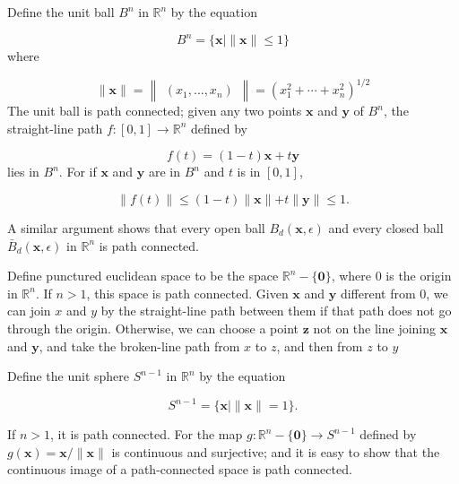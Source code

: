 \begin{centeredblock*}
\begin{example}
\label{ex:\thesection.\theexample}
 Define the unit ball \( B^{n}\) in \(\mathbb{R}^{n}\) by the equation

 \[
 B^{n} = \{ \mathbf{x} \mid \parallel \mathbf{x}\parallel \leq 1\}
 \]
 where

 \[
 \parallel \mathbf{x}\parallel = \begin{Vmatrix}( {x_{1},\ldots ,x_{n}}) \end{Vmatrix} = {( x_1^{2} + \cdots + x_n^{2}) }^{1/2}
 \]
The unit ball is path connected; given any two points \(\mathbf{x}\) and \(\mathbf{y}\) of \(B^{n}\), the straight-line path \(f : [ {0,1}] \rightarrow {\mathbb{R}}^{n}\) defined by

\[
f( t) = ( {1 - t}) \mathbf{x} + t\mathbf{y}
\]
lies in \(B^{n}\). For if \(\mathbf{x}\) and \(\mathbf{y}\) are in \(B^{n}\) and \(t\) is in \([ {0,1}]\),

\[
\parallel f( t) \parallel \leq ( {1 - t}) \parallel \mathbf{x}\parallel + t\parallel \mathbf{y}\parallel \leq 1.
\]

A similar argument shows that every open ball \(B_{d}( {\mathbf{x},\epsilon })\) and every closed ball \(\bar{B}_{d}( {\mathbf{x},\epsilon })\) in \(\mathbb{R}^{n}\) is path connected.
\end{example}
\end{centeredblock*}

\begin{centeredblock}
\begin{example}
\label{ex:\thesection.\theexample}
 Define punctured euclidean space to be the space \(\mathbb{R}^{n} - \{ \mathbf{0}\}\), where 0 is the origin in \(\mathbb{R}^{n}\). If \(n > 1\), this space is path connected. Given \(\mathbf{x}\) and \(\mathbf{y}\) different from 0, we can join \(x\) and \(y\) by the straight-line path between them if that path does not go through the origin. Otherwise, we can choose a point \(\mathbf{z}\) not on the line joining \(\mathbf{x}\) and \(\mathbf{y}\), and take the broken-line path from \(x\) to \(z\), and then from \(z\) to \(y\)
\end{example}
\end{centeredblock}

\begin{centeredblock}
\begin{example}
\label{ex:\thesection.\theexample}
 Define the unit sphere \(S^{n - 1}\) in \(\mathbb{R}^{n}\) by the equation

 \[
 S^{n - 1} = \{ \mathbf{x} \mid \parallel \mathbf{x}\parallel = 1\}.
 \]

If \(n > 1\), it is path connected. For the map \(g : \mathbb{R}^{n} - \{ \mathbf{0}\} \rightarrow {S}^{n - 1}\) defined by \(g( \mathbf{x}) = \mathbf{x}/\parallel \mathbf{x}\parallel\) is continuous and surjective; and it is easy to show that the continuous image of a path-connected space is path connected.
\end{example}
\end{centeredblock}

